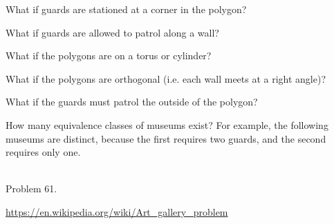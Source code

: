 \documentclass{article}
\begin{document}
  \begin{related}
    \item What if guards are stationed at a corner in the polygon?
    \item What if guards are allowed to patrol along a wall?
    \item What if the polygons are on a torus or cylinder?
    \item What if the polygons are orthogonal (i.e. each wall meets at a right angle)?
    \item What if the guards must patrol the outside of the polygon?
    \item How many equivalence classes of museums exist? For example, the
    following museums are distinct, because the first requires two guards, and
    the second requires only one.\\~\\
    \hspace{0.5cm}
  \end{related}
  \begin{references}
    \item Problem 61.
    \item \url{https://en.wikipedia.org/wiki/Art_gallery_problem}
  \end{references}
\end{document}
